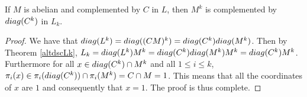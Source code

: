 \begin{theorem}
    If $M$ is abelian and complemented by $C$ in $L$, then $M^k$ is complemented by $diag({C^k})$ in $L_k$.
\end{theorem}

\begin{proof}
    We have that $diag({L^k}) = diag({(CM)^k}) = diag({C^k})diag({M^k})$. 
    Then by Theorem \ref{altdscLk}, $L_k = diag({L^k})M^k = diag({C^k})diag({M^k})M^k = diag({C^k})M^k$. 
    Furthermore for all $x \in diag({C^k}) \cap M^k$ and all $1 \le i \le k$, $\pi_i(x) \in \pi_i(diag({C^k})) \cap \pi_i(M^k) = C \cap M = 1$. 
    This means that all the coordinates of $x$ are $1$ and consequently that $x = 1$. The proof is thus complete.
\end{proof}
